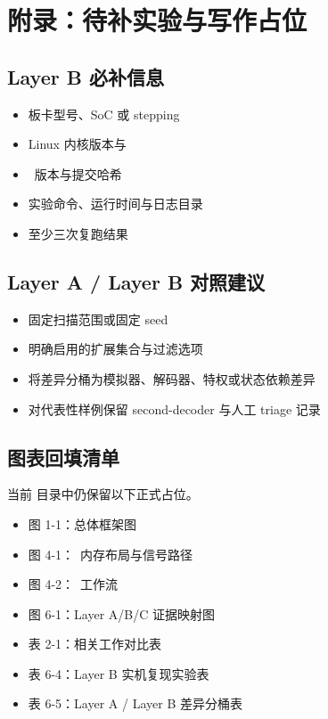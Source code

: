 \chapter{附录：待补实验与写作占位}

\section{Layer B 必补信息}

\begin{itemize}[leftmargin=2em]
  \item 板卡型号、SoC 或 stepping
  \item Linux 内核版本与 
  \item \capstone\ 版本与提交哈希
  \item 实验命令、运行时间与日志目录
  \item 至少三次复跑结果
\end{itemize}

\section{Layer A / Layer B 对照建议}

\begin{itemize}[leftmargin=2em]
  \item 固定扫描范围或固定 seed
  \item 明确启用的扩展集合与过滤选项
  \item 将差异分桶为模拟器、解码器、特权或状态依赖差异
  \item 对代表性样例保留 second-decoder 与人工 triage 记录
\end{itemize}

\section{图表回填清单}

当前  目录中仍保留以下正式占位。
\begin{itemize}[leftmargin=2em]
  \item 图 1-1：总体框架图
  \item 图 4-1：\memcage\ 内存布局与信号路径
  \item 图 4-2：\ptracebackend\ 工作流
  \item 图 6-1：Layer A/B/C 证据映射图
  \item 表 2-1：相关工作对比表
  \item 表 6-4：Layer B 实机复现实验表
  \item 表 6-5：Layer A / Layer B 差异分桶表
\end{itemize}
